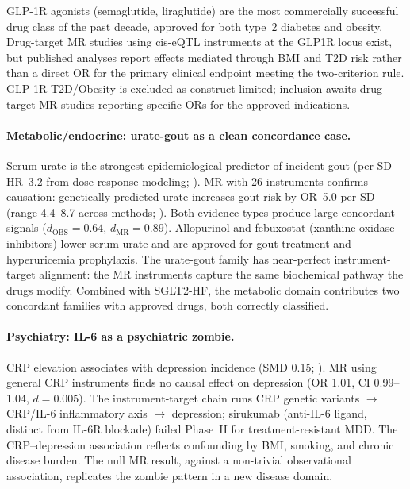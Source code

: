 \documentclass[11pt]{article}
\begin{document}
GLP-1R agonists (semaglutide, liraglutide) are the most commercially successful drug class of the past decade, approved for both type~2 diabetes and obesity. Drug-target MR studies using cis-eQTL instruments at the GLP1R locus exist, but published analyses report effects mediated through BMI and T2D risk rather than a direct OR for the primary clinical endpoint meeting the two-criterion rule. GLP-1R-T2D/Obesity is excluded as construct-limited; inclusion awaits drug-target MR studies reporting specific ORs for the approved indications.

\paragraph{Metabolic/endocrine: urate-gout as a clean concordance case.}
Serum urate is the strongest epidemiological predictor of incident gout (per-SD HR~3.2 from dose-response modeling; \cite{robinson2021urate}). MR with 26 instruments confirms causation: genetically predicted urate increases gout risk by OR~5.0 per SD (range 4.4--8.7 across methods; \cite{li2019uratemr}). Both evidence types produce large concordant signals ($d_{\text{OBS}} = 0.64$, $d_{\text{MR}} = 0.89$). Allopurinol and febuxostat (xanthine oxidase inhibitors) lower serum urate and are approved for gout treatment and hyperuricemia prophylaxis. The urate-gout family has near-perfect instrument-target alignment: the MR instruments capture the same biochemical pathway the drugs modify. Combined with SGLT2-HF, the metabolic domain contributes two concordant families with approved drugs, both correctly classified.

\paragraph{Psychiatry: IL-6 as a psychiatric zombie.}
CRP elevation associates with depression incidence (SMD 0.15; \cite{howren2009}). MR using general CRP instruments finds no causal effect on depression (OR 1.01, CI 0.99--1.04, $d = 0.005$). The instrument-target chain runs CRP genetic variants $\to$ CRP/IL-6 inflammatory axis $\to$ depression; sirukumab (anti-IL-6 ligand, distinct from IL-6R blockade) failed Phase~II for treatment-resistant MDD. The CRP--depression association reflects confounding by BMI, smoking, and chronic disease burden. The null MR result, against a non-trivial observational association, replicates the zombie pattern in a new disease domain.
\end{document}
